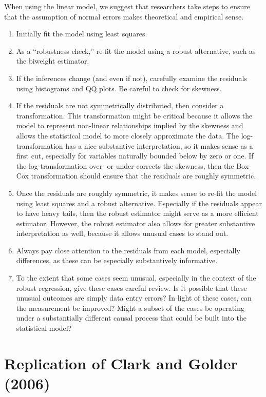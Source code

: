 \documentclass[12pt]{article}
\begin{document}
When using the linear model, we suggest that researchers take steps to ensure that the assumption of normal errors makes theoretical and empirical sense. 
\begin{enumerate}
	\item Initially fit the model using least squares. 
	\item As a ``robustness check,'' re-fit the model using a robust alternative, such as the biweight estimator. 
	\item If the inferences change (and even if not), carefully examine the residuals using histograms and QQ plots. Be careful to check for skewness.
	\item If the residuals are not symmetrically distributed, then consider a transformation. 
	This transformation might be critical because it allows the model to represent non-linear relationships implied by the skewness and allows the statistical model to more closely approximate the data. 
	The log-transformation has a nice substantive interpretation, so it makes sense as a first cut, especially for variables naturally bounded below by zero or one. 
	If the log-transformation over- or under-corrects the skewness, then the Box-Cox transformation should ensure that the residuals are roughly symmetric.
	\item Once the residuals are roughly symmetric, it makes sense to re-fit the model using least squares and a robust alternative. 
	Especially if the residuals appear to have heavy tails, then the robust estimator might serve as a more efficient estimator. 
	However, the robust estimator also allows for greater substantive interpretation as well, because it allows unusual cases to stand out.
	\item Always pay close attention to the residuals from each model, especially differences, as these can be especially substantively informative.
	\item To the extent that some cases seem unusual, especially in the context of the robust regression, give these cases careful review. 
	Is it possible that these unusual outcomes are simply data entry errors? 
	In light of these cases, can the measurement be improved? 
	Might a subset of the cases be operating under a substantially different causal process that could be built into the statistical model? 
\end{enumerate}

\section*{Replication of Clark and Golder (2006)}
\end{document}
